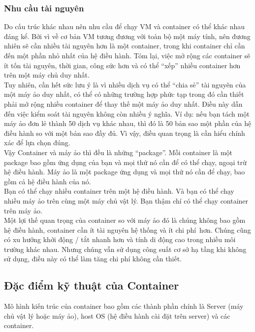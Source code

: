 \documentclass[12pt,a4paper]{report}
\begin{document}
				\subsubsection{Nhu cầu tài nguyên}
		\hspace{0.6cm}Do cấu trúc khác nhau nên nhu cầu để chạy VM và container có thể khác nhau đáng kể. Bởi vì về cơ bản VM tương đương với toàn bộ một máy tính, nên đương nhiên sẽ cần nhiều tài nguyên hơn là một container, trong khi container chỉ cần đến một phần nhỏ nhất của hệ điều hành. Tóm lại, việc mở rộng các container sẽ ít tốn tài nguyên, thời gian, công sức hơn và có thể “xếp” nhiều container hơn trên một máy chủ duy nhất.\\
		
		Tuy nhiên, cần hết sức lưu ý là vì nhiều dịch vụ có thể “chia sẻ” tài nguyên của một máy ảo duy nhất, có thể có những trường hợp phức tạp trong đó cần thiết phải mở rộng nhiều container để thay thế một máy ảo duy nhất. Điều này dẫn đến việc kiểm soát tài nguyên không còn nhiều ý nghĩa. Ví dụ: nếu bạn tách một máy ảo đơn lẻ thành 50 dịch vụ khác nhau, thì đó là 50 bản sao một phần của hệ điều hành so với một bản sao đầy đủ. Vì vậy, điều quan trọng là cần hiểu chính xác để lựa chọn đúng.\\
		
		Vậy Container và máy ảo thì đều là những “package”. Mỗi container là một package bao gồm ứng dụng của bạn và mọi thứ nó cần để có thể chạy, ngoại trừ hệ điều hành. Máy ảo là một package ứng dụng và mọi thứ nó cần để chạy, bao gồm cả hệ điều hành của nó.\\
		
		Bạn có thể chạy nhiều container trên một hệ điều hành. Và bạn có thể chạy nhiều máy ảo trên cùng một máy chủ vật lý. Bạn thậm chí có thể chạy container trên máy ảo.\\
		
		Một lợi thế quan trọng của container so với máy ảo đó là chúng không bao gồm hệ điều hành, container cần ít tài nguyên hệ thống và ít chi phí hơn. Chúng cũng có xu hướng khởi động / tắt nhanh hơn và tính di động cao trong nhiều môi trường khác nhau. Nhưng chúng vẫn sử dụng công suất cơ sở hạ tầng khi không sử dụng, điều này có thể làm tăng chi phí không cần thiết.
		\subsection{Đặc điểm kỹ thuật của Container}
		\hspace{0.6cm}Mô hình kiến trúc của container bao gồm các thành phần chính là Server (máy chủ vật lý hoặc máy ảo), host OS (hệ điều hành cài đặt trên server) và các container.\\
		
\end{document}
